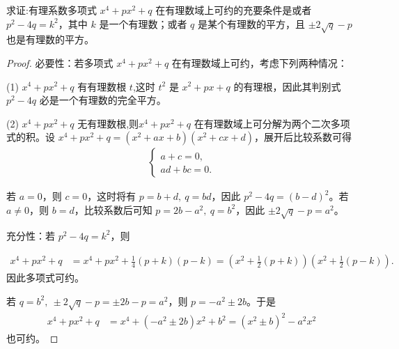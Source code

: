 \documentclass[../../main.tex]{subfiles}%
\begin{document}
\begin{example}
求证:有理系数多项式 $x^4 + px^2 + q$ 在有理数域上可约的充要条件是或者 $p^2 - 4q = k^2$，其中 $k$ 是一个有理数；或者 $q$ 是某个有理数的平方，且 $\pm 2\sqrt{q} - p$ 也是有理数的平方。
\end{example}
\begin{proof}
必要性：若多项式 $x^4 + px^2 + q$ 在有理数域上可约，考虑下列两种情况：

(1) $x^4 + px^2 + q$ 有有理数根 $t$,这时 $t^2$ 是 $x^2 + px + q$ 的有理根，因此其判别式 $p^2 - 4q$ 必是一个有理数的完全平方。

(2) $x^4 + px^2 + q$ 无有理数根,则$x^4 + px^2 + q$ 在有理数域上可分解为两个二次多项式的积。设 $x^4 + px^2 + q = (x^2 + ax + b)(x^2 + cx + d)$，展开后比较系数可得
\begin{align*}
\begin{cases}
a + c = 0, \\
ad + bc = 0.
\end{cases}
\end{align*}

若 $a = 0$，则 $c = 0$，这时将有 $p = b + d, \ q = bd$，因此 $p^2 - 4q = (b - d)^2$。若 $a \neq 0$，则 $b = d$，比较系数后可知 $p = 2b - a^2, \ q = b^2$，因此 $\pm 2\sqrt{q} - p = a^2$。

充分性：若 $p^2 - 4q = k^2$，则

\begin{align*}
x^4 + px^2 + q &= x^4 + px^2 + \frac{1}{4}(p + k)(p - k) = \left(x^2 + \frac{1}{2}(p + k)\right)\left(x^2 + \frac{1}{2}(p - k)\right).
\end{align*}
因此多项式可约。

若 $q = b^2, \ \pm 2\sqrt{q} - p = \pm 2b - p = a^2$，则 $p = -a^2 \pm 2b$。于是
\begin{align*}
x^4 + px^2 + q &= x^4 + (-a^2 \pm 2b)x^2 + b^2 = (x^2 \pm b)^2 - a^2x^2
\end{align*}
也可约。
\end{proof}
\end{document}
